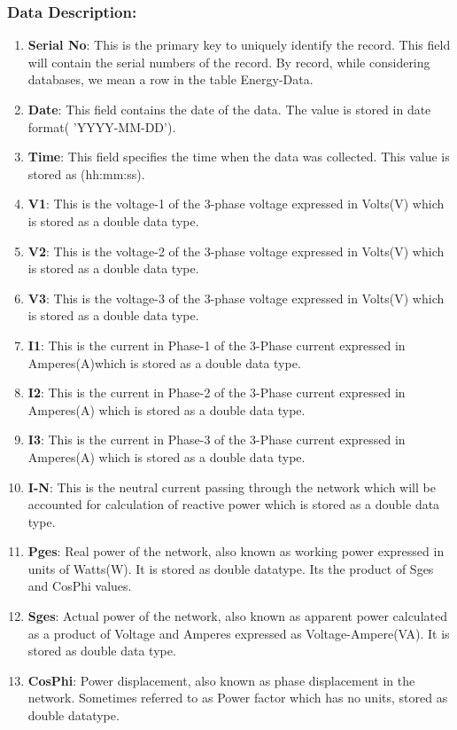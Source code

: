 \subsubsection*{Data Description:}
 \begin{enumerate}
\item \textbf{Serial No}: This is the primary key to uniquely identify the record. This field will contain the serial numbers of the record. By record, while considering databases, we mean a row in the table Energy-Data.
\item \textbf{Date}: This field contains the date of the data. The value is stored in date format( 'YYYY-MM-DD').
\item \textbf{Time}: This field specifies the time when the data was collected. This value is stored as (hh:mm:ss).
\item \textbf{V1}: This is the voltage-1 of the 3-phase voltage expressed in Volts(V) which is stored as a double data type. 
\item \textbf{V2}: This is the voltage-2 of the 3-phase voltage expressed in Volts(V) which is stored as a double data type.  
\item \textbf{V3}: This is the voltage-3 of the 3-phase voltage expressed in Volts(V) which is stored as a double data type. 
\item \textbf{I1}: This is the current in Phase-1 of the 3-Phase current expressed in Amperes(A)which is stored as a double data type. 
\item \textbf{I2}: This is the current in Phase-2 of the 3-Phase current expressed in Amperes(A) which is stored as a double data type. 
\item \textbf{I3}: This is the current in Phase-3 of the 3-Phase current expressed in Amperes(A) which is stored as a double data type. 
\item \textbf{I-N}: This is the neutral current passing through the network which will be accounted for calculation of reactive power which is stored as a double data type. 
\item \textbf{Pges}: Real power of the network, also known as working power expressed in units of Watts(W). It is stored as double datatype. Its the product of Sges and CosPhi values.
\item \textbf{Sges}: Actual power of the network, also known as apparent power calculated as a product of Voltage and Amperes expressed as Voltage-Ampere(VA). It is stored as double data type.
\item \textbf{CosPhi}: Power displacement, also known as phase displacement in the network. Sometimes referred to as Power factor which has no units, stored as double datatype.

\end{enumerate}
